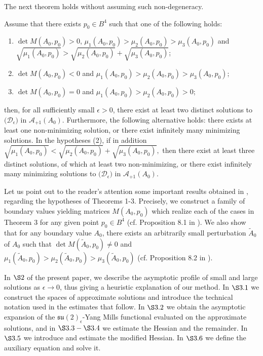 \documentclass[11pt]{article}
\numberwithin{equation}{section} \setlength{\topmargin}{-35pt}
\begin{document}
The next theorem holds without assuming such non-degeneracy.
\begin{theorem}
Assume that there exists $p_0\in B^4$ such that one of the following
holds:

\begin{enumerate}[(1)]
\item   $\det M(A_0,p_0)>0$,
$\mu_1(A_0,p_0)>\mu_2(A_0,p_0)>\mu_3(A_0,p_0)$ and
$\sqrt{\mu_1(A_0,p_0)}>\sqrt{\mu_2(A_0,p_0)}+\sqrt{\mu_3(A_0,p_0)}$;
\item $\det M(A_0,p_0)<0$ and $\mu_1(A_0,p_0)>\mu_2(A_0,p_0)>\mu_3(A_0,p_0)$;
\item $\det M(A_0,p_0)=0$ and $\mu_1(A_0,p_0)>\mu_2(A_0,p_0)>0$;
\end{enumerate}
then, for all sufficiently small $\epsilon>0$, there exist at least
two distinct solutions to $\bigl(\mathcal{D}_{\epsilon}\bigr)$ in
$\mathcal{A}_{+1}(A_0).$ Furthermore, the following alternative
holds: there exists at least one non-minimizing solution, or there
exist infinitely many minimizing solutions. In the hypotheses (2),
if in addition
$\sqrt{\mu_1(A_0,p_0)}<\sqrt{\mu_2(A_0,p_0)}+\sqrt{\mu_3(A_0,p_0)},$
then  there exist at least three distinct solutions, of which at
least two non-minimizing, or there exist infinitely many minimizing
solutions to $\bigl(\mathcal{D}_{\epsilon}\bigr)$ in
$\mathcal{A}_{+1}(A_0)$.
\end{theorem}

\medskip
Let us point out to the reader's attention some important results
obtained in \cite{IM2}, regarding the hypotheses of Theorems 1-3.
Precisely, we construct a family of boundary values yielding
matrices $M(A_0,p_0)$ which realize each of the cases in Theorem 3
for any given point $p_0\in B^4$ (cf. Proposition 8.1 in
\cite{IM2}). We also show that for any boundary value $A_0$, there
exists an arbitrarily small perturbation $\tilde{A}_0$ of $A_0$ such
that $\det M(\tilde{A}_0,p_0)\ne 0$ and
$\mu_1(\tilde{A}_0,p_0)>\mu_2(\tilde{A}_0,p_0)>\mu_3(\tilde{A}_0,p_0)$
(cf. Proposition 8.2 in \cite{IM2}).

\medskip
\noindent In $\S2$ of the present paper, we describe the asymptotic
profile of small and large solutions as $\epsilon\to 0$, thus giving
a heuristic explanation of our method. In $\S3.1$ we construct the
spaces of approximate solutions and introduce the technical notation
used in the estimates that follow. In $\S3.2$ we obtain the
asymptotic expansion of the $\mathfrak{su}(2)_\epsilon$-Yang Mills
functional evaluated on the approximate solutions, and in
$\S3.3-\S3.4$ we estimate the Hessian and the remainder. In $\S3.5$
we introduce and estimate the modified Hessian. In $\S3.6$ we define
the auxiliary equation and solve it.
\end{document}
